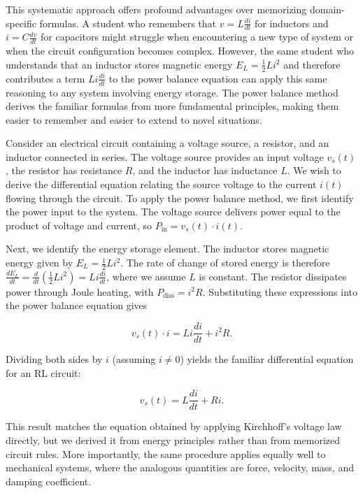 This systematic approach offers profound advantages over memorizing domain-specific formulas. A student who remembers that $v = L\frac{di}{dt}$ for inductors and $i = C\frac{dv}{dt}$ for capacitors might struggle when encountering a new type of system or when the circuit configuration becomes complex. However, the same student who understands that an inductor stores magnetic energy $E_L = \frac{1}{2}Li^2$ and therefore contributes a term $L i \frac{di}{dt}$ to the power balance equation can apply this same reasoning to any system involving energy storage. The power balance method derives the familiar formulas from more fundamental principles, making them easier to remember and easier to extend to novel situations.

Consider an electrical circuit containing a voltage source, a resistor, and an inductor connected in series. The voltage source provides an input voltage $v_s(t)$, the resistor has resistance $R$, and the inductor has inductance $L$. We wish to derive the differential equation relating the source voltage to the current $i(t)$ flowing through the circuit. To apply the power balance method, we first identify the power input to the system. The voltage source delivers power equal to the product of voltage and current, so $P_{\text{in}} = v_s(t) \cdot i(t)$.

Next, we identify the energy storage element. The inductor stores magnetic energy given by $E_L = \frac{1}{2}Li^2$. The rate of change of stored energy is therefore $\frac{dE_L}{dt} = \frac{d}{dt}\left(\frac{1}{2}Li^2\right) = Li \frac{di}{dt}$, where we assume $L$ is constant. The resistor dissipates power through Joule heating, with $P_{\text{diss}} = i^2R$. Substituting these expressions into the power balance equation gives

\[
v_s(t) \cdot i = Li \frac{di}{dt} + i^2R.
\]

Dividing both sides by $i$ (assuming $i \neq 0$) yields the familiar differential equation for an RL circuit:

\[
v_s(t) = L \frac{di}{dt} + Ri.
\]

This result matches the equation obtained by applying Kirchhoff's voltage law directly, but we derived it from energy principles rather than from memorized circuit rules. More importantly, the same procedure applies equally well to mechanical systems, where the analogous quantities are force, velocity, mass, and damping coefficient.

